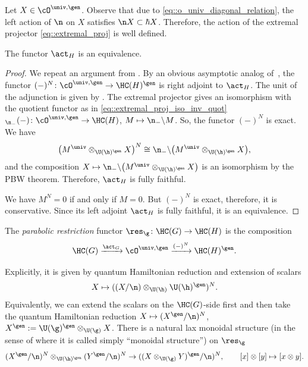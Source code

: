 	Let $X\in \cO^{\univ,\gen}$. Observe that due to \eqref{eq::o_univ_diagonal_relation}, the left action of $\n$ on $X$ satisfies $\n X \subset \hbar X$. Therefore, the action of the extremal projector \eqref{eq::extremal_proj} is well defined.
	
	\begin{Proposition}
		\label{prop::act_equiv}
		The functor $\act_H$ is an equivalence.
		\begin{proof}
			We repeat an argument from \cite[Theorem 4.17]{KalmykovSafronov}. By an obvious asymptotic analog of~\cite[Proposition 4.6]{KalmykovSafronov}, the functor $(-)^{N}\colon \cO^{\univ,\gen} \rightarrow \HC(H)^{\gen}$ is right adjoint to $\act_H$. The unit of the adjunction is given by
			.
			The extremal projector gives an isomorphism with the quotient functor as in \eqref{eq::extremal_proj_iso_inv_quot}
$
			{}_{\n_-}(-)\colon \cO^{\univ,\gen} \rightarrow \HC(H)$, $ M \mapsto \n_- \backslash M$.
			So, the functor $(-)^{N}$ is exact. We have
			\[
			\bigl(M^{\univ} \otimes_{\U(\h)^{\gen}} X\bigr)^{N} \cong \n_- \backslash \bigl(M^{\univ} \otimes_{\U(\h)^{\gen}} X\bigr),
			\]
			and the composition
			$
			X \mapsto \n_- \backslash \bigl(M^{\univ} \otimes_{\U(\h)^{\gen}} X\bigr)
			$
			is an isomorphism by the PBW theorem. Therefore, $\act_H$ is fully faithful.
			
			We have $M^{N} = 0$ if and only if $M=0$. But $(-)^{N}$ is exact, therefore, it is conservative. Since its left adjoint $\act_H$ is fully faithful, it is an equivalence.
		\end{proof}
	\end{Proposition}
	
	\begin{Definition}
		\label{def::parabolic_reduction}
		The \emph{parabolic restriction} functor $\res_{\g}\colon \HC(G) \rightarrow \HC(H)$ is the composition
		\[
		\HC(G) \xrightarrow{\act_G} \cO^{\univ,\gen} \xrightarrow{(-)^{N}} \HC(H)^{\gen}.
		\]
	\end{Definition}
	Explicitly, it is given by quantum Hamiltonian reduction and extension of scalars
	\[
	X \mapsto ((X/ \n) \otimes_{\U(\h)} \U(\h)^{\gen})^{N}.
	\]
	Equivalently, we can extend the scalars on the $\HC(G)$-side first and then take the quantum Hamiltonian reduction
$
	X \mapsto (X^{\gen}/ \n )^{N}$, $ X^{\gen} := \U(\g)^{\gen} \otimes_{\U(\g)} X$.
	There is a natural lax monoidal structure (in the sense of \cite[Section XI.2]{Maclane} where it is called simply ``monoidal structure'') on $\res_{\g}$
	\[%
		(X^{\gen}/\n)^{N} \otimes_{\U(\h)^{\gen}} (Y^{\gen}/\n)^{N} \rightarrow ((X \otimes_{\U(\g)} Y)^{\gen} / \n)^{N}, \qquad [x] \otimes [y] \mapsto [x\otimes y].
	\]
	
